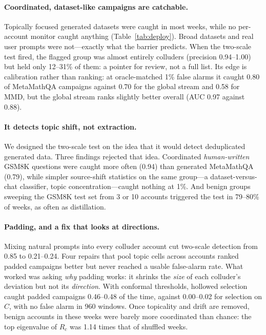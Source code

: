 \paragraph{Coordinated, dataset-like campaigns are catchable.} Topically focused generated datasets were caught in most weeks, while no per-account monitor caught anything (Table~\ref{tab:deploy}). Broad datasets and real user prompts were not---exactly what the barrier predicts. When the two-scale test fired, the flagged group was almost entirely colluders (precision 0.94--1.00) but held only 12--31\% of them: a pointer for review, not a full list. Its edge is calibration rather than ranking: at oracle-matched 1\% false alarms it caught 0.80 of MetaMathQA campaigns against 0.70 for the global stream and 0.58 for MMD, but the global stream ranks slightly better overall (AUC 0.97 against 0.88).

\paragraph{It detects topic shift, not extraction.} We designed the two-scale test on the idea that it would detect deduplicated generated data. Three findings rejected that idea. Coordinated \emph{human-written} GSM8K questions were caught more often (0.94) than generated MetaMathQA (0.79), while simpler source-shift statistics on the same group---a dataset-versus-chat classifier, topic concentration---caught nothing at 1\%. And benign groups sweeping the GSM8K test set from 3 or 10 accounts triggered the test in 79--80\% of weeks, as often as distillation.

\paragraph{Padding, and a fix that looks at directions.} Mixing natural prompts into every colluder account cut two-scale detection from 0.85 to 0.21--0.24. Four repairs that pool topic cells across accounts ranked padded campaigns better but never reached a usable false-alarm rate. What worked was asking \emph{why} padding works: it shrinks the \emph{size} of each colluder's deviation but not its \emph{direction}. With conformal thresholds, hollowed selection caught padded campaigns 0.46--0.48 of the time, against 0.00--0.02 for selection on $C$, with no false alarm in 960 windows. Once topicality and drift are removed, benign accounts in these weeks were barely more coordinated than chance: the top eigenvalue of $R_c$ was 1.14 times that of shuffled weeks.

